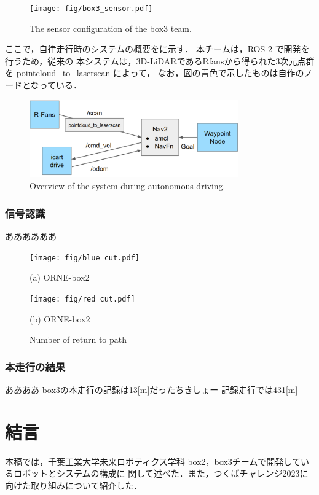 \documentclass[twocolumn, 9pt]{jsproceedings}
\begin{document}
\begin{figure}[h!]
  \centering
  \texttt{[image: fig/box3\_sensor.pdf]}
  \caption{The sensor configuration of the box3 team.}
  \label{fig:box3-sensor}
\end{figure}


ここで，自律走行時のシステムの概要をに示す．
本チームは，ROS 2 で開発を行うため，従来の 
本システムは，3D-LiDARであるRfansから得られた3次元点群を pointcloud\_to\_laserscan によって，
なお，図の青色で示したものは自作のノードとなっている．
\begin{figure}[h!]
  \centering
  \includegraphics[width=90mm]{fig/box3_system.pdf}
  \caption{Overview of the system during autonomous driving.}
  \label{fig:box3-system}
\end{figure}

\newpage
\subsubsection{信号認識}
ああああああ

\begin{figure}[h!]
  \begin{minipage}[t]{0.47\linewidth}
    \centering
    \texttt{[image: fig/blue\_cut.pdf]}
    \caption*{(a) ORNE-box2}
  \end{minipage}
  \hspace*{2mm}
  \begin{minipage}[t]{0.47\linewidth}
    \centering
    \texttt{[image: fig/red\_cut.pdf]}
    \caption*{(b) ORNE-box2}
  \end{minipage}%
  \caption{Number of return to path}
\end{figure}

\subsubsection{本走行の結果}
ああああ
box3の本走行の記録は13[m]だったちきしょー
記録走行では431[m]



\section{結言}
本稿では，千葉工業大学未来ロボティクス学科 box2，box3チームで開発しているロボットとシステムの構成に
関して述べた．また，つくばチャレンジ2023に向けた取り組みについて紹介した．\\
\end{document}
